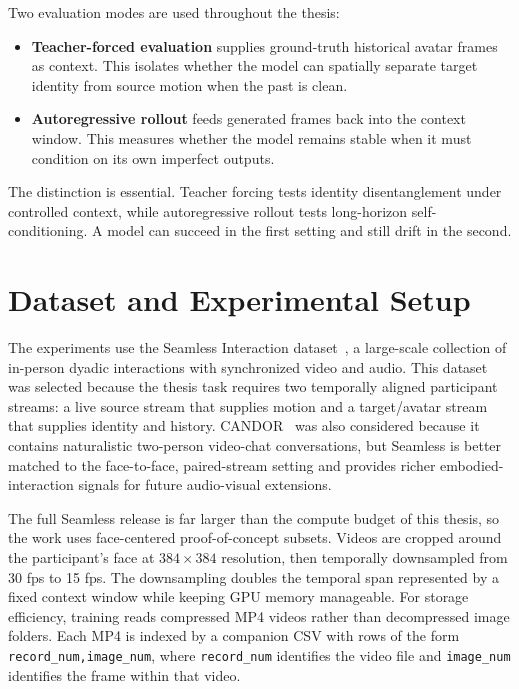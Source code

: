 \documentclass[12pt,letterpaper]{report}
\begin{document}
Two evaluation modes are used throughout the thesis:

\begin{itemize}
    \item \textbf{Teacher-forced evaluation} supplies ground-truth historical avatar frames as context. This isolates whether the model can spatially separate target identity from source motion when the past is clean.
    \item \textbf{Autoregressive rollout} feeds generated frames back into the context window. This measures whether the model remains stable when it must condition on its own imperfect outputs.
\end{itemize}

The distinction is essential. Teacher forcing tests identity disentanglement under controlled context, while autoregressive rollout tests long-horizon self-conditioning. A model can succeed in the first setting and still drift in the second.

\section{Dataset and Experimental Setup}

The experiments use the Seamless Interaction dataset~\cite{seamlessinteraction2025}, a large-scale collection of in-person dyadic interactions with synchronized video and audio. This dataset was selected because the thesis task requires two temporally aligned participant streams: a live source stream that supplies motion and a target/avatar stream that supplies identity and history. CANDOR~\cite{reece2023candor} was also considered because it contains naturalistic two-person video-chat conversations, but Seamless is better matched to the face-to-face, paired-stream setting and provides richer embodied-interaction signals for future audio-visual extensions.

The full Seamless release is far larger than the compute budget of this thesis, so the work uses face-centered proof-of-concept subsets. Videos are cropped around the participant's face at $384 \times 384$ resolution, then temporally downsampled from 30 fps to 15 fps. The downsampling doubles the temporal span represented by a fixed context window while keeping GPU memory manageable. For storage efficiency, training reads compressed MP4 videos rather than decompressed image folders. Each MP4 is indexed by a companion CSV with rows of the form \texttt{record\_num,image\_num}, where \texttt{record\_num} identifies the video file and \texttt{image\_num} identifies the frame within that video.
\end{document}
